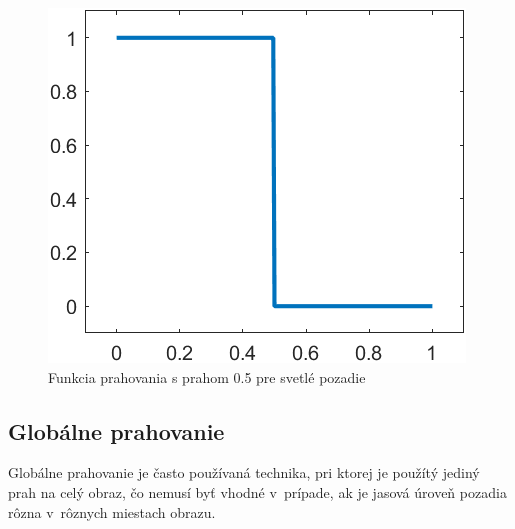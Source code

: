     \begin{figure}[!ht]
        \begin{center}
            \includegraphics[scale=.4]{obrazky/threshold/thresholding.png}
        \end{center}
        \caption{Funkcia prahovania s prahom 0.5 pre svetlé pozadie}
    \end{figure}

\subsection{Globálne prahovanie}

    Globálne prahovanie je často používaná technika, pri ktorej je použítý jediný prah na celý obraz, čo nemusí byť vhodné v~prípade, ak je jasová úroveň pozadia rôzna v~rôznych miestach obrazu. \cite{Morse1998/1}

